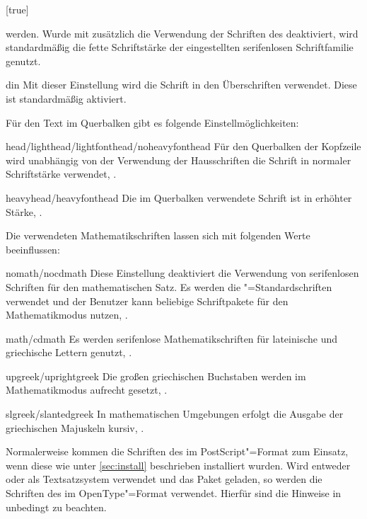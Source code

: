 \begin{Declaration*}{}
\begin{Declaration*}{}
\begin{Declaration*}{}
\begin{Declaration}[%
  v2.02!\Option{cdfont=head};
  v2.02!\Option{cdfont=heavyhead};
  v2.03!\Option{cdfont=din};
  v2.03!\Option{cdfont=nodin};
]{}[true]
\begin{values}{}
  werden. Wurde mit  zusätzlich die Verwendung der 
  Schriften des \CDs deaktiviert, wird standardmäßig die fette Schriftstärke 
  der eingestellten serifenlosen Schriftfamilie genutzt.
\item[din]
  Mit dieser Einstellung wird die Schrift \DIN in den Überschriften verwendet. 
  Diese ist standardmäßig aktiviert.
\end{values}
%
Für den Text im Querbalken gibt es folgende Einstellmöglichkeiten:
%
\begin{values}{}
\item[head/lighthead/lightfonthead/noheavyfonthead]
  Für den Querbalken der Kopfzeile wird unabhängig von der Verwendung der 
  Hausschriften die Schrift \Univers in normaler Schriftstärke verwendet,
  .
\item[heavyhead/heavyfonthead]
  Die im Querbalken verwendete Schrift ist \Univers in erhöhter Stärke, 
  .
\end{values}
%
Die verwendeten Mathematikschriften lassen sich mit folgenden Werte 
beeinflussen:
%
\begin{values}{}
\item[nomath/nocdmath] 
  Diese Einstellung deaktiviert die Verwendung von serifenlosen Schriften für 
  den mathematischen Satz. Es werden die "=Standardschriften 
  verwendet und der Benutzer kann beliebige Schriftpakete für den 
  Mathematikmodus nutzen, .
\item[math/cdmath]
  Es werden serifenlose Mathematikschriften für lateinische und griechische 
  Lettern genutzt, .
\item[upgreek/uprightgreek]
  Die großen griechischen Buchstaben werden im Mathematikmodus aufrecht gesetzt,
  .
\item[slgreek/slantedgreek]
  In mathematischen Umgebungen erfolgt die Ausgabe der griechischen Majuskeln 
  kursiv, .
\end{values}
%
Normalerweise kommen die Schriften des \CDs im PostScript"=Format zum Einsatz, 
wenn diese wie unter \autoref{sec:install} beschrieben installiert wurden.
Wird entweder  oder  als Textsatzsystem 
verwendet und das Paket  geladen, so werden die Schriften des 
\CDs im OpenType"=Format verwendet. Hierfür sind die Hinweise in 
 unbedingt zu beachten.
\end{Declaration}



\end{Declaration*}
\end{Declaration*}
\end{Declaration*}
